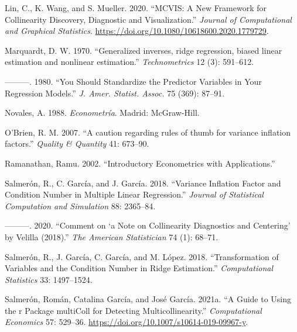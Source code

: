 \begin{CSLReferences}{1}{0}
\leavevmode{}%
Lin, C., K. Wang, and S. Mueller. 2020. {``MCVIS: A New Framework for Collinearity Discovery, Diagnostic and Visualization.''} \emph{Journal of Computational and Graphical Statistics}. \url{https://doi.org/10.1080/10618600.2020.1779729}.

\leavevmode{}%
Marquardt, D. W. 1970. {``{Generalized inverses, ridge regression, biased linear estimation and nonlinear estimation}.''} \emph{Technometrics} 12 (3): 591--612.

\leavevmode{}%
---------. 1980. {``You Should Standardize the Predictor Variables in Your Regression Models.''} \emph{J. Amer. Statist. Assoc.} 75 (369): 87--91.

\leavevmode{}%
Novales, A. 1988. \emph{{Econometría}}. Madrid: McGraw-Hill.

\leavevmode{}%
O'Brien, R. M. 2007. {``{A caution regarding rules of thumb for variance inflation factors}.''} \emph{Quality \& Quantity} 41: 673--90.

\leavevmode{}%
Ramanathan, Ramu. 2002. {``Introductory Econometrics with Applications.''}

\leavevmode{}%
Salmerón, R., C. García, and J. García. 2018. {``Variance Inflation Factor and Condition Number in Multiple Linear Regression.''} \emph{Journal of Statistical Computation and Simulation} 88: 2365--84.

\leavevmode{}%
---------. 2020. {``Comment on {`a Note on Collinearity Diagnostics and Centering'} by Velilla (2018).''} \emph{The American Statistician} 74 (1): 68--71.

\leavevmode{}%
Salmerón, R., J. García, C. García, and M. López. 2018. {``Transformation of Variables and the Condition Number in Ridge Estimation.''} \emph{Computational Statistics} 33: 1497--1524.

\leavevmode{}%
Salmerón, Román, Catalina García, and José García. 2021a. {``A Guide to Using the r Package multiColl for Detecting Multicollinearity.''} \emph{Computational Economics} 57: 529--36. \url{https://doi.org/10.1007/s10614-019-09967-y}.


\end{CSLReferences}
